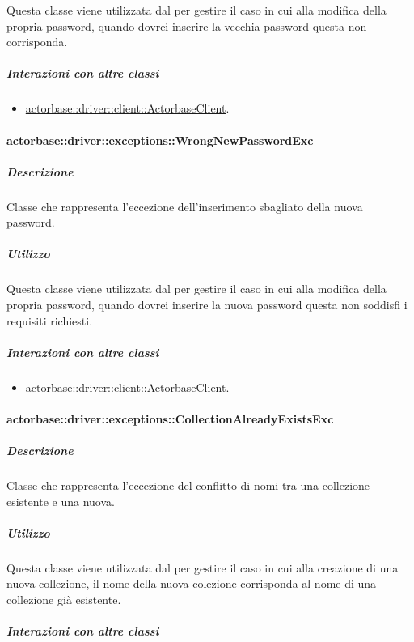 \documentclass{scalatekids-article}
\begin{document}
Questa classe viene utilizzata dal  per gestire il caso in cui alla modifica della propria password, quando dovrei inserire la vecchia password questa non corrisponda. 

\subparagraph{Interazioni con altre classi}

\begin{itemize}
\item \hyperref[sec:actorbase::driver::client::ActorbaseClient]{actorbase::driver::client::ActorbaseClient}.
\end{itemize}

\paragraph{actorbase::driver::exceptions::WrongNewPasswordExc}

\subparagraph{Descrizione}

Classe che rappresenta l'eccezione dell'inserimento sbagliato della nuova password.

\subparagraph{Utilizzo}

Questa classe viene utilizzata dal  per gestire il caso in cui alla modifica della propria password, quando dovrei inserire la nuova password questa non soddisfi i requisiti richiesti.

\subparagraph{Interazioni con altre classi}

\begin{itemize}
\item \hyperref[sec:actorbase::driver::client::ActorbaseClient]{actorbase::driver::client::ActorbaseClient}.
\end{itemize}

\paragraph{actorbase::driver::exceptions::CollectionAlreadyExistsExc}

\subparagraph{Descrizione}

Classe che rappresenta l'eccezione del conflitto di nomi tra una collezione esistente e una nuova.

\subparagraph{Utilizzo}

Questa classe viene utilizzata dal  per gestire il caso in cui alla creazione di una nuova collezione, il nome della nuova colezione corrisponda al nome di una collezione già esistente.

\subparagraph{Interazioni con altre classi}
\end{document}
